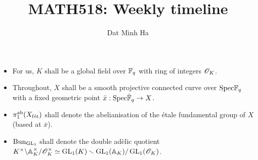 
\usepackage{soul}





	\title{\textbf{MATH518: Weekly timeline}}
	
	\author{Dat Minh Ha}
	\maketitle
	
	\begin{convention}
	    \noindent
	    \begin{itemize}
	        \item For us, $K$ shall be a global field over $\mathbb{F}_q$ with ring of integers $\mathscr{O}_K$.
	        \item Throughout, $X$ shall be a smooth projective connected curve over $\mathrm{Spec} \mathbb{F}_q$ with a fixed geometric point $\bar{x}: \mathrm{Spec} \bar{\mathbb{F}}_q \to X$.
	        \item $\pi_1^{\mathrm{ab}}(X_{\mathrm{f\acute{e}t}})$ shall denote the abelianisation of the \'etale fundamental group of $X$ (based at $\bar{x}$).
	        \item $\mathrm{Bun}_{\operatorname{GL}_1}$ shall denote the double ad\`elic quotient $K^{\x}\backslash\A_K^{\x}/\scrO_K^{\x} \cong \GL_1(K)\setminus\GL_1(\A_K)/\GL_1(\scrO_K)$.
	    \end{itemize}
	\end{convention}
	
